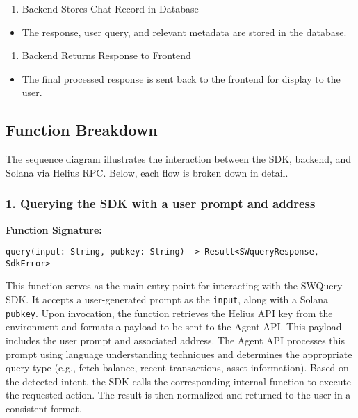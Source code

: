 \documentclass[
]{article}
\providecommand{\tightlist}{%
  \setlength{\itemsep}{0pt}\setlength{\parskip}{0pt}}
\begin{document}
\begin{enumerate}
\def\labelenumi{\arabic{enumi}.}
\setcounter{enumi}{12}
\tightlist
\item
  Backend Stores Chat Record in Database
\end{enumerate}

\begin{itemize}
\tightlist
\item
  The response, user query, and relevant metadata are stored in the
  database.
\end{itemize}

\begin{enumerate}
\def\labelenumi{\arabic{enumi}.}
\setcounter{enumi}{13}
\tightlist
\item
  Backend Returns Response to Frontend
\end{enumerate}

\begin{itemize}
\tightlist
\item
  The final processed response is sent back to the frontend for display
  to the user.
\end{itemize}

\hypertarget{function-breakdown}{%
\subsection{Function Breakdown}\label{function-breakdown}}

The sequence diagram illustrates the interaction between the SDK,
backend, and Solana via Helius RPC. Below, each flow is broken down in
detail.

\subsubsection{1. Querying the SDK with a user prompt and address}
\textbf{Function Signature:}
\begin{verbatim}
query(input: String, pubkey: String) -> Result<SWqueryResponse, SdkError>
\end{verbatim}

This function serves as the main entry point for interacting with the SWQuery SDK. It accepts a user-generated prompt as the \texttt{input}, along with a Solana \texttt{pubkey}. Upon invocation, the function retrieves the Helius API key from the environment and formats a payload to be sent to the Agent API. This payload includes the user prompt and associated address. The Agent API processes this prompt using language understanding techniques and determines the appropriate query type (e.g., fetch balance, recent transactions, asset information). Based on the detected intent, the SDK calls the corresponding internal function to execute the requested action. The result is then normalized and returned to the user in a consistent format.
\end{document}
